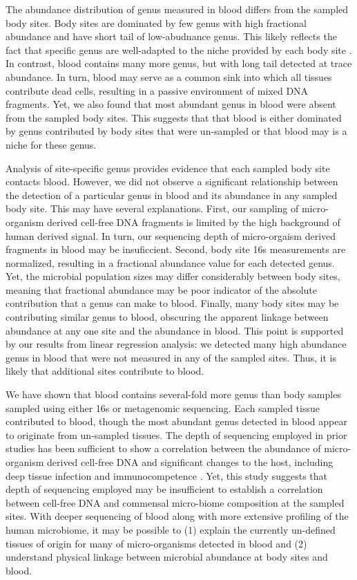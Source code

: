 The abundance distribution of genus measured in blood differs from the sampled body sites. Body sites are dominated by few genus with high fractional abundance and have short tail of low-abudnance genus. This likely reflects the fact that specific genus are well-adapted to the niche provided by each body site  \cite{Consortium:2012bb}. In contrast, blood contains many more genus, but with long tail detected at trace abundance. In turn, blood may serve as a common sink into which all tissues contribute dead cells, resulting in a passive environment of mixed DNA fragments. Yet, we also found that most abundant genus in blood were absent from the sampled body sites. This suggests that that blood is either dominated by genus contributed by body sites that were un-sampled or that blood may is a niche for these genus.

Analysis of site-specific genus provides evidence that each sampled body site contacts blood. However, we did not observe a significant relationship between the detection of a particular genus in blood and its abundance in any sampled body site. This may have several explanations. First, our sampling of micro-organism derived cell-free DNA fragments is limited by the high background of human derived signal. In turn, our sequencing depth of micro-orgaism derived fragments in blood may be insuficcient. Second, body site 16s measurements are normalized, resulting in a fractional abundance value for each detected genus. Yet, the microbial population sizes may differ considerably between body sites, meaning that fractional abundance may be poor indicator of the absolute contribution that a genus can make to blood. Finally, many body sites may be contributing similar genus to blood, obscuring the apparent linkage between abundance at any one site and the abundance in blood. This point is supported by our results from linear regression analysis: we detected many high abundance genus in blood that were not measured in any of the sampled sites. Thus, it is likely that additional sites contribute to blood. 

We have shown that blood contains several-fold more genus than body samples sampled using either 16s or metagenomic sequencing. Each sampled tissue contributed to blood, though the most abundant genus detected in blood appear to originate from un-sampled tissues. The depth of sequencing employed in prior studies has been sufficient to show a correlation between the abundance of micro-organism derived cell-free DNA and significant changes to the host, including deep tissue infection and immunocompetence \cite{DeVlaminck:2013hl}. Yet, this study suggests that depth of sequencing employed may be insufficient to establish a correlation between cell-free DNA and commensal micro-biome composition at the sampled sites. With deeper sequencing of blood along with more extensive profiling of the human microbiome, it may be possible to (1) explain the currently un-defined tissues of origin for many of micro-organisms detected in blood and (2) understand physical linkage between microbial abundance at body sites and blood.
